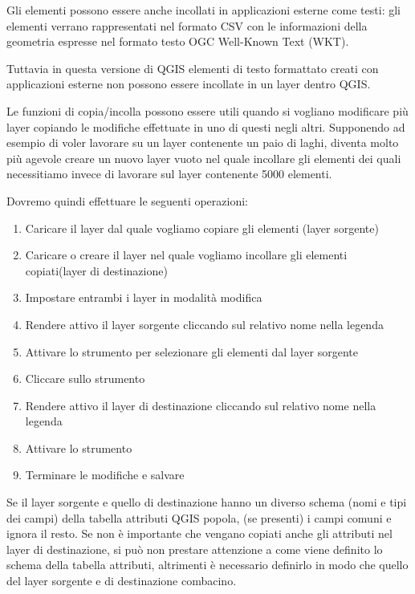 Gli elementi possono essere anche incollati in applicazioni esterne come testi: gli elementi verrano rappresentati nel formato CSV con le informazioni della geometria espresse nel formato testo OGC Well-Known Text (WKT).

Tuttavia in questa versione di QGIS elementi di testo formattato creati con
applicazioni esterne non possono essere incollate in un layer dentro QGIS.

Le funzioni di copia/incolla possono essere utili quando si vogliano modificare più layer copiando le modifiche effettuate in uno di questi negli
altri. Supponendo ad esempio di voler lavorare su un layer contenente un paio
di laghi, diventa molto più agevole creare un nuovo layer vuoto nel quale
incollare gli elementi dei quali necessitiamo invece di lavorare sul layer  contenente 5000 elementi. 

Dovremo quindi effettuare le seguenti operazioni:

\begin{enumerate}
\item Caricare il layer dal quale vogliamo copiare gli elementi (layer
sorgente)
\item Caricare o creare il layer nel quale vogliamo incollare gli elementi
copiati(layer di destinazione) 
\item Impostare entrambi i layer in modalità modifica 
\item Rendere attivo il layer sorgente cliccando sul relativo nome nella
legenda 
\item Attivare lo strumento 
per selezionare gli elementi dal layer sorgente
\item Cliccare sullo strumento 
\item Rendere attivo il layer di destinazione cliccando sul relativo nome
nella legenda
\item Attivare lo strumento  
\item Terminare le modifiche e salvare
\end{enumerate}

Se il layer sorgente e quello di destinazione hanno un diverso schema (nomi e
tipi dei campi) della
tabella attributi QGIS popola, (se presenti) i campi comuni e ignora il resto.
Se non è importante che vengano copiati anche gli attributi nel layer di
destinazione, si può non prestare attenzione a come viene definito lo schema
della tabella attributi, altrimenti è necessario definirlo in modo che quello
del layer sorgente e di destinazione combacino.

